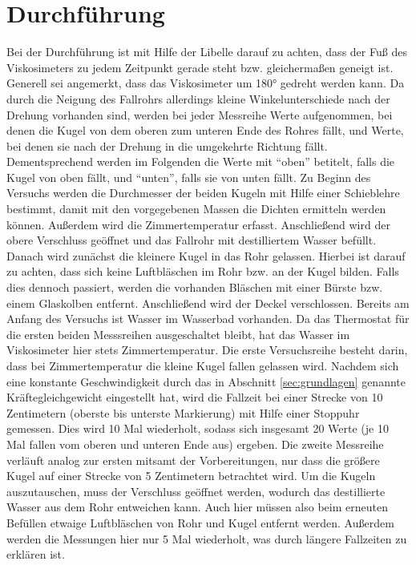 \section{Durchführung}
Bei der Durchführung ist mit Hilfe der Libelle darauf zu achten, dass der Fuß des Viskosimeters zu jedem Zeitpunkt gerade steht
bzw. gleichermaßen geneigt ist.
Generell sei angemerkt, dass das Viskosimeter um 180° gedreht werden kann. 
Da durch die Neigung des Fallrohrs allerdings kleine Winkelunterschiede nach der Drehung vorhanden sind, werden bei jeder Messreihe Werte aufgenommen,
bei denen die Kugel von dem oberen zum unteren Ende des Rohres fällt, und Werte, bei denen sie nach der Drehung in die umgekehrte Richtung fällt.
Dementsprechend werden im Folgenden die Werte mit \enquote{oben} betitelt, falls die Kugel von oben fällt, und \enquote{unten}, falls sie von unten fällt.
Zu Beginn des Versuchs werden die Durchmesser der beiden Kugeln mit Hilfe einer Schieblehre bestimmt,
damit mit den vorgegebenen Massen die Dichten ermitteln werden können.
Außerdem wird die Zimmertemperatur erfasst.
Anschließend wird der obere Verschluss geöffnet und das Fallrohr mit destilliertem Wasser befüllt. 
Danach wird zunächst die kleinere Kugel in das Rohr gelassen.
Hierbei ist darauf zu achten, dass sich keine Luftbläschen im Rohr bzw. an der Kugel bilden.
Falls dies dennoch passiert, werden die vorhanden Bläschen mit einer Bürste bzw. einem Glaskolben entfernt.
Anschließend wird der Deckel verschlossen.
Bereits am Anfang des Versuchs ist Wasser im Wasserbad vorhanden. 
Da das Thermostat für die ersten beiden Messsreihen ausgeschaltet bleibt, hat das Wasser im Viskosimeter hier stets Zimmertemperatur.
%
Die erste Versuchsreihe besteht darin, dass bei Zimmertemperatur die kleine Kugel fallen gelassen wird.
Nachdem sich eine konstante Geschwindigkeit durch das in Abschnitt \ref{sec:grundlagen} genannte Kräftegleichgewicht eingestellt hat,
wird die Fallzeit bei einer Strecke von 10 Zentimetern (oberste bis unterste Markierung)
mit Hilfe einer Stoppuhr gemessen.
Dies wird 10 Mal wiederholt, sodass sich insgesamt 20 Werte (je 10 Mal fallen vom oberen und unteren Ende aus) ergeben.
%
Die zweite Messreihe verläuft analog zur ersten mitsamt der Vorbereitungen, nur dass die größere Kugel auf einer Strecke von 5 Zentimetern betrachtet wird.
Um die Kugeln auszutauschen, muss der Verschluss geöffnet werden, wodurch das destillierte Wasser aus dem Rohr entweichen kann.
Auch hier müssen also beim erneuten Befüllen etwaige Luftbläschen von Rohr und Kugel entfernt werden.
Außerdem werden die Messungen hier nur 5 Mal wiederholt, was durch längere Fallzeiten zu erklären ist.
